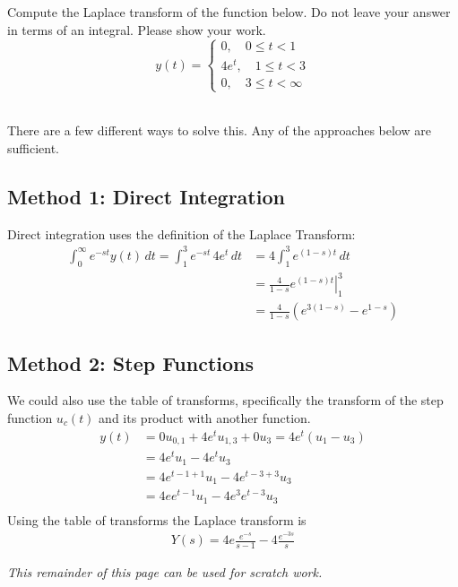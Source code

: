 
\ifnum {}
\question[3] 
Compute the Laplace transform of the function below. Do not leave your answer in terms of an integral. Please show your work. 
$$y(t) = \begin{cases} 0, \quad 0 \le t < 1 \\ 4e^{t}, \quad 1 \le t < 3 \\ 0, \quad 3 \le t < \infty\end{cases}$$
\ifnum {} {\color{DarkBlue} \\[12pt] 
There are a few different ways to solve this. Any of the approaches below are sufficient. 
\subsection*{Method 1: Direct Integration }
Direct integration uses the definition of the Laplace Transform:
    \begin{align}
        \int_0^{\infty} e^{-st} y(t) \, dt 
        = \int_1^{3} e^{-st} \, 4e^{t} \, dt 
        &= 4\int_1^{3} e^{(1-s)t}  \, dt  \\         
        &= \left.\frac{4}{1-s} e^{(1-s)t} \right|_1^3  \\         
        &= \frac{4}{1-s} \left(e^{3(1-s)}  - e^{1-s} \right)     
    \end{align}
    \subsection*{Method 2: Step Functions}
    We could also use the table of transforms, specifically the transform of the step function $u_c(t)$ and its product with another function. 
    \begin{align}
        y(t) &= 0u_{0,1} + 4e^tu_{1,3} + 0u_{3} 
        =4e^t(u_1-u_3) \\
        &= 4e^tu_1 - 4 e^tu_3 \\
        &= 4e^{t-1+1}u_1 - 4 e^{t-3+3}u_3 \\
        &= 4ee^{t-1}u_1 - 4 e^3e^{t-3}u_3 \\
    \end{align}   
    Using the table of transforms the Laplace transform is
    \begin{align}
        Y(s) = 4 e\frac{e^{-s}}{s-1} - 4\frac{e^{-3s}}{s}
    \end{align}
} 
\else 
    \vfill
    \begin{center}
        \textit{This remainder of this page can be used for scratch work. }
    \end{center}
    \vfill
\fi
\fi